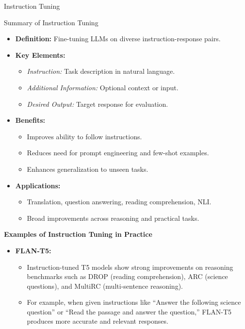 \begin{frame}[allowframebreaks]{Instruction Tuning}
    \framebreak
    \begin{block}{Summary of Instruction Tuning}
        \begin{itemize}
            \setlength{\itemsep}{1em}
            \item \textbf{Definition:} Fine-tuning LLMs on diverse instruction-response pairs.
            \item \textbf{Key Elements:}
            \begin{itemize}
                \item \textit{Instruction:} Task description in natural language.
                \item \textit{Additional Information:} Optional context or input.
                \item \textit{Desired Output:} Target response for evaluation.
            \end{itemize}
            \item \textbf{Benefits:}
            \begin{itemize}
                \item Improves ability to follow instructions.
                \item Reduces need for prompt engineering and few-shot examples.
                \item Enhances generalization to unseen tasks.
            \end{itemize}
            \item \textbf{Applications:}
            \begin{itemize}
                \item Translation, question answering, reading comprehension, NLI.
                \item Broad improvements across reasoning and practical tasks.
            \end{itemize}
        \end{itemize}
    \end{block}
    \framebreak
    \textbf{Examples of Instruction Tuning in Practice}
        \begin{itemize}
            \item \textbf{FLAN-T5:}
            \begin{itemize}
                \item Instruction-tuned T5 models show strong improvements on reasoning benchmarks such as DROP (reading comprehension), ARC (science questions), and MultiRC (multi-sentence reasoning).
                \item For example, when given instructions like ``Answer the following science question'' or ``Read the passage and answer the question,'' FLAN-T5 produces more accurate and relevant responses.

\end{itemize}
\end{itemize}
\end{frame}
